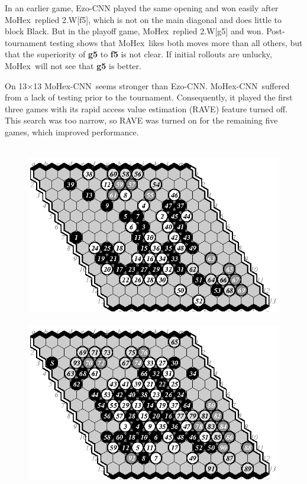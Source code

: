 \documentclass{IOS-Book-Article}
\def\Ec{\mbox{\sc Ezo-CNN}}
\def\Mx{\mbox{\sc MoHex}}
\def\Mc{\mbox{\sc MoHex-CNN}}
\begin{document}
In an earlier game, \Ec{} played the same opening
and won easily after \Mx\ replied 2.W[f5], 
which is not on the main diagonal and does little to block Black.
But in the playoff game, \Mx\ replied 2.W[g5] and won.
Post-tournament testing shows that \Mx\ likes both moves more than all others,
but that the superiority of {\bf g5} to {\bf f5} is not clear.
If initial rollouts are unlucky, \Mx\ will not see that {\bf g5} is better.

On 13$\times$13 \Mc\ seems stronger than \Ec.
\Mc\ suffered from a lack of testing prior to the tournament.
Consequently, it played the first three games with 
its rapid access value estimation (RAVE)
feature turned off. This search was too narrow, 
so RAVE was turned on for the remaining five games, which improved
performance.

\begin{figure}
\noindent\hspace*{-2cm}\
\includegraphics[scale=.9]{pix/13.me1plus.eps}\hspace*{-1.8cm}\
\includegraphics[scale=.9]{pix/13.em2plus.eps}\hspace*{-1.8cm}\

\end{figure}
\end{document}
